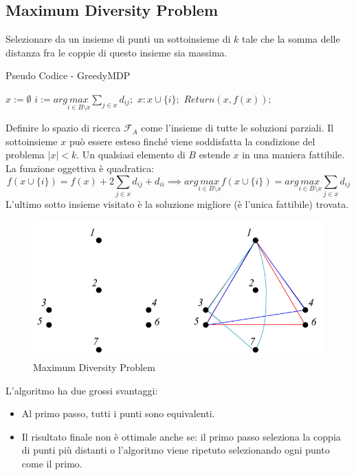 \documentclass{article}
\begin{document}
    \subsection{Maximum Diversity Problem}
    Selezionare da un insieme di punti un sottoinsieme di $k$ tale che la somma delle distanza
    fra le coppie di questo insieme sia massima.
    \begin{algorithm}[H]
        \caption{Pseudo Codice - GreedyMDP}
        \begin{algorithmic}
            \State $x:=\emptyset$
            \State $i:=arg\underset{i \in B\setminus x}{max}\sum_{j\in x}d_{ij};$
            \State $x:x\cup\{i\};$
            \EndWhile
            \State $Return(x,f(x));$
        \end{algorithmic}
    \end{algorithm}

    Definire lo spazio di ricerca $\mathcal{F}_A$ come l'insieme di tutte le soluzioni parziali. Il
    sottoinsieme $x$ può essere esteso finché viene soddisfatta la condizione del problema $|x|<k$.
    Un qualsiasi elemento di $B$ estende $x$ in una maniera fattibile. La funzione oggettiva è quadratica:
    $$f(x\cup\{i\})=f(x)+2\sum_{j\in x}d_{ij}+d_{ii}\implies arg\underset{i\in B\setminus x}{max}f(x\cup \{i\})=arg\underset{i\in B\setminus x}{max}\sum_{j\in x} d_{ij}$$
    L'ultimo sotto insieme visitato è la soluzione migliore (è l'unica fattibile) trovata.

    \begin{figure}[H]
        \centering
        \includegraphics[scale=0.5]{images/MDP_construct.png}
        \caption{Maximum Diversity Problem}
    \end{figure}

    L'algoritmo ha due grossi svantaggi:
    \begin{itemize}
        \item Al primo passo, tutti i punti sono equivalenti.
        \item Il risultato finale non è ottimale anche se: il primo passo seleziona la coppia di
              punti più distanti o l'algoritmo viene ripetuto selezionando ogni punto come il primo.
    \end{itemize}
\end{document}
